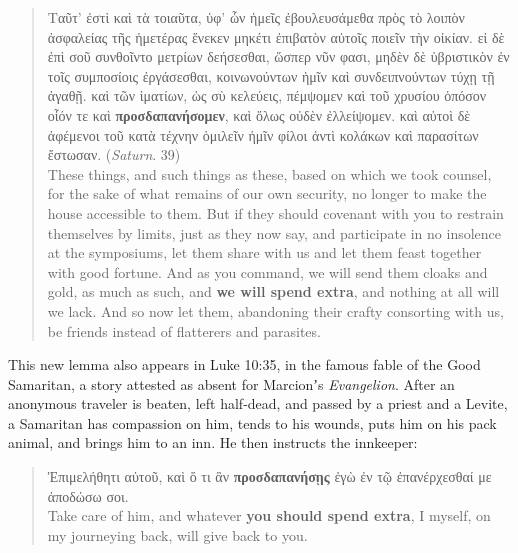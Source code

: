  \begin{quote}Ταῦτ’ ἐστὶ καὶ τὰ τοιαῦτα, 
 ὑφ’ ὧν ἡμεῖς ἐβουλευσάμεθα πρὸς τὸ λοιπὸν ἀσφαλείας τῆς ἡμετέρας %
 ἕνεκεν μηκέτι ἐπιβατὸν αὐτοῖς ποιεῖν τὴν οἰκίαν. %
 εἰ δὲ ἐπὶ σοῦ συνθοῖντο μετρίων δεήσεσθαι, %
 ὥσπερ νῦν φασι, μηδὲν δὲ ὑβριστικὸν ἐν τοῖς συμποσίοις ἐργάσεσθαι, %
 κοινωνούντων ἡμῖν καὶ συνδειπνούντων τύχῃ τῇ ἀγαθῇ. %
 καὶ τῶν ἱματίων, ὡς σὺ κελεύεις, %
 πέμψομεν καὶ τοῦ χρυσίου ὁπόσον οἷόν τε καὶ \textbf{προσδαπανήσομεν}, %
 καὶ ὅλως οὐδὲν ἐλλείψομεν. %
 καὶ αὐτοὶ δὲ ἀφέμενοι τοῦ κατὰ τέχνην ὁμιλεῖν %
 ἡμῖν φίλοι ἀντὶ κολάκων καὶ παρασίτων ἔστωσαν. (\textit{Saturn}. 39) \\[1mm] %
 These things, and such things as these, %
 based on which we took counsel, %
 for the sake of what remains of our own security, %
 no longer to make the house accessible to them. %
 But if they should covenant with you to restrain themselves by limits, %
 just as they now say, %
 and participate in no insolence at the symposiums, %
 let them share with us and let them feast together with good fortune. %
 And as you command, %
 we will send them cloaks and gold, %
 as much as such, and \textbf{we will spend extra}, %
 and nothing at all will we lack. %
 And so now let them, abandoning their crafty consorting %
 with us, be friends instead of flatterers and parasites. \end{quote} %
 \vspace*{2mm}

This new lemma also appears in Luke 10:35, %
in the famous fable of the Good Samaritan, %
a story attested as absent for Marcionʼs \textit{Evangelion}. %
After an anonymous traveler is beaten, left half-dead, %
and passed by a priest and a Levite, %
a Samaritan has compassion on him, %
tends to his wounds, puts him on his pack animal, %
and brings him to an inn. %
He then instructs the innkeeper: %

\vspace*{2mm} 
 \begin{quote}Ἐπιμελήθητι αὐτοῦ, %
 καὶ ὅ τι ἂν \textbf{προσδαπανήσῃς} %
 ἐγὼ ἐν τῷ ἐπανέρχ\-εσθαί με ἀποδώσω σοι. \\[1mm] %
 Take care of him, %
 and whatever \textbf{you should spend extra}, %
 I myself, on my journeying back, will give back to you. %
 \end{quote} %
\vspace*{2mm}

